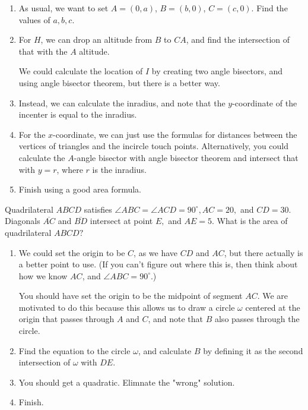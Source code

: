 \documentclass{article}
\begin{document}
\begin{walk}

\begin{enumerate}[label=(\alph*)]
    \item As usual, we want to set $A=(0,a)$, $B=(b,0)$, $C=(c,0)$. Find the values of $a,b,c$. 
    \item For $H$, we can drop an altitude from $B$ to $CA$, and find the intersection of that with the $A$ altitude.
    
    We could calculate the location of $I$ by creating two angle bisectors, and using angle bisector theorem, but there is a better way. 

    \item Instead, we can calculate the inradius, and note that the $y$-coordinate of the incenter is equal to the inradius.
    \item For the $x$-coordinate, we can just use the formulas for distances between the vertices of triangles and the incircle touch points. Alternatively, you could calculate the $A$-angle bisector with angle bisector theorem and intersect that with $y=r$, where $r$ is the inradius.
    \item Finish using a good area formula. 
\end{enumerate}

\end{walk}

\begin{exam}
Quadrilateral $ABCD$ satisfies $\angle ABC = \angle ACD = 90^{\circ}, AC=20,$ and $CD=30.$ Diagonals $\overline{AC}$ and $\overline{BD}$ intersect at point $E,$ and $AE=5.$ What is the area of quadrilateral $ABCD?$
\end{exam}

\begin{walk}

\begin{enumerate}[label=(\alph*)]
    \item We could set the origin to be $C$, as we have $CD$ and $AC$, but there actually is a better point to use. (If you can't figure out where this is, then think about how we know $AC$, and $\angle ABC=90^{\circ}$.)
    
    You should have set the origin to be the midpoint of segment $AC$. We are motivated to do this because this allows us to draw a circle $\omega$ centered at the origin that passes through $A$ and $C$, and note that $B$ also passes through the circle.
    
    \item Find the equation to the circle $\omega$, and calculate $B$ by defining it as the second intersection of $\omega$ with $DE$. 
    \item You should get a quadratic. Elimnate the "wrong" solution.
    \item Finish. 
\end{enumerate}

\end{walk}
\end{document}
